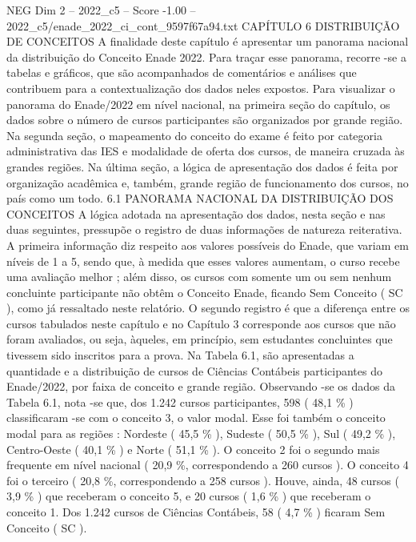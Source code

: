 \begin{textsample}{NEG Dim 2 – 2022\_c5 – Score -1.00 – 2022\_c5/enade\_2022\_ci\_cont\_9597f67a94.txt}  \label{ex:f2_neg_211}
CAPÍTULO 6 DISTRIBUIÇÃO DE CONCEITOS A finalidade deste capítulo é apresentar um panorama nacional da distribuição do Conceito Enade 2022.
Para traçar esse panorama, recorre -se a tabelas e gráficos, que são acompanhados de comentários e análises que contribuem para a contextualização dos dados neles expostos.
Para visualizar o panorama do Enade/2022 em nível nacional, na primeira seção do capítulo, os dados sobre o número de cursos participantes são organizados por grande região.
Na segunda seção, o mapeamento do conceito do exame é feito por categoria administrativa das IES e modalidade de oferta dos cursos, de maneira cruzada às grandes regiões.
Na última seção, a lógica de apresentação dos dados é feita por organização acadêmica e, também, grande região de funcionamento dos cursos, no país como um todo. 6.1 PANORAMA NACIONAL DA DISTRIBUIÇÃO DOS CONCEITOS A lógica adotada na apresentação dos dados, nesta seção e nas duas seguintes, pressupõe o registro de duas informações de natureza reiterativa.
A primeira informação diz respeito aos valores possíveis do Enade, que variam em níveis de 1 a 5, sendo que, à medida que esses valores aumentam, o curso recebe uma avaliação melhor ; além disso, os cursos com somente um ou sem nenhum concluinte participante não obtêm o Conceito Enade, ficando Sem Conceito ( SC ), como já ressaltado neste relatório.
O segundo registro é que a diferença entre os cursos tabulados neste capítulo e no Capítulo 3 corresponde aos cursos que não foram avaliados, ou seja, àqueles, em princípio, sem estudantes concluintes que tivessem sido inscritos para a prova.
Na Tabela 6.1, são apresentadas a quantidade e a distribuição de cursos de Ciências Contábeis participantes do Enade/2022, por faixa de conceito e grande região.
Observando -se os dados da Tabela 6.1, nota -se que, dos 1.242 cursos participantes, 598 ( 48,1 \% ) classificaram -se com o conceito 3, o valor modal.
Esse foi também o conceito modal para as regiões : Nordeste ( 45,5 \% ), Sudeste ( 50,5 \% ), Sul ( 49,2 \% ), Centro-Oeste ( 40,1 \% ) e Norte ( 51,1 \% ).
O conceito 2 foi o segundo mais frequente em nível nacional ( 20,9 \%, correspondendo a 260 cursos ).
O conceito 4 foi o terceiro ( 20,8 \%, correspondendo a 258 cursos ).
Houve, ainda, 48 cursos ( 3,9 \% ) que receberam o conceito 5, e 20 cursos ( 1,6 \% ) que receberam o conceito 1.
Dos 1.242 cursos de Ciências Contábeis, 58 ( 4,7 \% ) ficaram Sem Conceito ( SC ).

\end{textsample}
